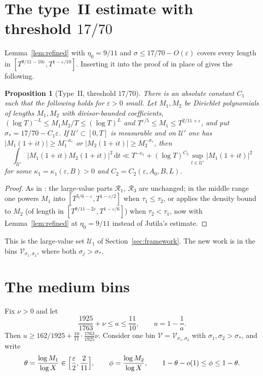 \documentclass[11pt,a4paper]{amsart}
\newtheorem{proposition}[theorem]{Proposition}
\theoremstyle{definition}
\newcommand{\e}{\varepsilon}
\newcommand{\dd}{\,\mathrm d}
\newcommand{\1}{\mathbf 1}
\newcommand{\cR}{\mathcal R}
\newcommand{\cU}{\mathcal U}
\newcommand{\cV}{\mathcal V}
\begin{document}
\section{The type~II estimate with threshold \texorpdfstring{\(17/70\)}{17/70}}
\label{sec:typeII}

Lemma~\ref{lem:refined} with \(\eta_0=9/11\) and \(\sigma\le17/70-O(\e)\)
covers every length in \([T^{9/11-10\e},T^{1-\e/10}]\).  Inserting it
into the proof of \cite[Proposition~4.2]{MT} in place of
\cite[Lemma~4.1]{MT} gives the following.

\begin{proposition}[Type~II, threshold \(17/70\)]\label{prop:typeII}
There is an absolute constant \(C_1\) such that the following holds for
\(\e>0\) small.  Let \(M_1,M_2\) be Dirichlet polynomials of lengths
\(M_1,M_2\) with divisor-bounded coefficients,
\((\log T)^{-L}\le M_1M_2/T\le(\log T)^L\) and
\(T^{\e/5}\le M_1\le T^{2/11+\e}\), and put
\(\sigma_*=17/70-C_1\e\).  If \(\cU'\subset[0,T]\) is measurable and on
\(\cU'\) one has \(|M_1(1+it)|\ge M_1^{-\sigma_*}\) or
\(|M_2(1+it)|\ge M_2^{-\sigma_*}\), then
\[
 \int_{\cU'}|M_1(1+it)M_2(1+it)|^2\dd t
 \ll T^{-\kappa_1}+(\log T)^{C_2}\sup_{t\in\cU'}|M_1(1+it)|^2
\]
for some \(\kappa_1=\kappa_1(\e,B)>0\) and \(C_2=C_2(\e,A_0,B,L)\).
\end{proposition}

\begin{proof}
As in \cite[Proposition~4.2]{MT}: the large-value parts \(\cR_1\),
\(\cR_3\) are unchanged; in the middle range one powers \(M_1\) into
\([T^{5/6-\e},T^{1-\e/2}]\) when \(\tau_1\le\tau_2\), or applies the
density bound to \(M_2\) (of length in \([T^{9/11-2\e},T^{1-\e/6}]\))
when \(\tau_2<\tau_1\), now with Lemma~\ref{lem:refined} at
\(\eta_0=9/11\) instead of Jutila's estimate.
\end{proof}

This is the large-value set \(\cU_1\) of Section~\ref{sec:framework}.
The new work is in the bins \(\cV_{\sigma_1,\sigma_2}\), where both
\(\sigma_j>\sigma_*\).

\section{The medium bins}\label{sec:bins}

Fix \(\nu>0\) and let
\[
 \frac{1925}{1763}+\nu\le a\le\frac{11}{10},\qquad u=1-\frac1a .
\]
Then \(u\ge162/1925+\frac{10}{11}\cdot\frac{1763}{1925}\nu\).  Consider
one bin \(\cV=\cV_{\sigma_1,\sigma_2}\) with \(\sigma_1,\sigma_2>\sigma_*\),
and write
\[
 \theta=\frac{\log M_1}{\log X}\in\Bigl[\frac\e2,\frac2{11}\Bigr],
 \qquad
 \phi=\frac{\log M_2}{\log X},\qquad
 1-\theta-o(1)\le\phi\le1-\theta .
\]
\end{document}
